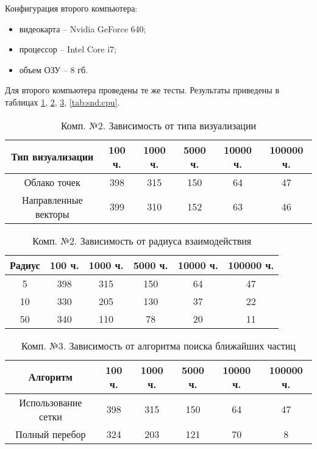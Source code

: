 Конфигурация второго компьютера:

\begin{itemize} 
  \item видеокарта -- Nvidia GeForce 640;
  \item процессор -- Intel Core i7;
  \item объем ОЗУ -- 8 гб.
\end{itemize} 

Для второго компьютера проведены те же тесты. Результаты приведены в таблицах
\ref{tab:snd:simple}, \ref{tab:snd:radius}, \ref{tab:snd:algorithm}, \ref{tab:snd:cpu}.

\begin{table}[H] 
  \caption{\label{tab:snd:simple}Комп. №2. Зависимость от типа визуализации} 
  \begin{center}
    \begin{tabular}{|c|c|c|c|c|c|}
      \hline
      Тип визуализации & 100 ч. & 1000 ч. & 5000 ч. & 10000 ч. & 100000 ч. \\
      \hline
      Облако точек & 398 & 315 & 150 & 64 & 47 \\
      Направленные векторы & 399 & 310 & 152 & 63 & 46 \\
      \hline
    \end{tabular}
  \end{center}
\end{table}

\begin{table}[H]
  \caption{\label{tab:snd:radius}Комп. №2. Зависимость от радиуса взаимодействия}
  \begin{center}
    \begin{tabular}{|c|c|c|c|c|c|}
      \hline
      Радиус & 100 ч. & 1000 ч. & 5000 ч. & 10000 ч. & 100000 ч. \\
      \hline
      5 & 398 & 315 & 150 & 64 & 47 \\
      10 & 330 & 205 & 130 & 37 & 22 \\
      50 & 340 & 110 & 78 & 20 & 11 \\
      \hline
    \end{tabular}
  \end{center}
\end{table}

\begin{table}[H]
  \caption{\label{tab:snd:algorithm}Комп. №3. Зависимость от алгоритма поиска ближайших частиц}
  \begin{center}
    \begin{tabular}{|c|c|c|c|c|c|}
      \hline
      Алгоритм & 100 ч. & 1000 ч. & 5000 ч. & 10000 ч. & 100000 ч. \\
      \hline
      Использование сетки & 398 & 315 & 150 & 64 & 47 \\
      Полный перебор & 324 & 203 & 121 & 70 & 8 \\
      \hline
    \end{tabular}
  \end{center}
\end{table}

